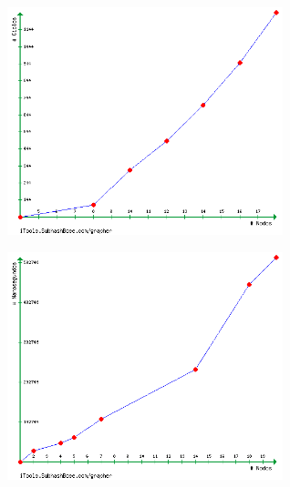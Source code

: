 \begin {center}
\includegraphics[width=8cm]{./graficos/goloso_1.png}
\end {center} 

\begin {center}
\includegraphics[width=8cm]{./graficos/goloso_2.png}
\end {center}
